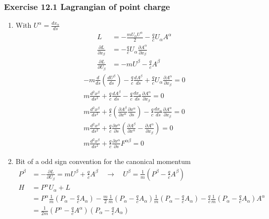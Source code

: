 \documentclass[10pt,a4paper]{book}
\theoremstyle{definition}
\begin{document}
\subsubsection{Exercise 12.1 Lagrangian of point charge}
\begin{enumerate}
\item With $U^\alpha=\frac{dx_\alpha}{ds}$
\begin{align}
	L&=-\frac{mU_\alpha U^\alpha}{2}-\frac{q}{c}U_\alpha A^\alpha\\
	\frac{\partial L}{\partial x_\beta}&=-\frac{q}{c}U_\alpha\frac{\partial A^\alpha}{\partial x_\beta}\\
	\frac{\partial L}{\partial U_\beta}&=-mU^\beta-\frac{q}{c}A^\beta
\end{align}
\begin{align}
	-m\frac{d}{ds}\left(\frac{dU^\beta}{ds}\right)-\frac{q}{c}\frac{dA^\beta}{ds}+\frac{q}{c}U_\alpha\frac{\partial A^\alpha}{\partial x_\beta}=0\\
	m\frac{d^2x^\beta}{ds^2}+\frac{q}{c}\frac{dA^\beta}{ds}-\frac{q}{c}\frac{dx_\alpha}{ds}\frac{\partial A^\alpha}{\partial x_\beta}=0\\
	m\frac{d^2x^\beta}{ds^2}+\frac{q}{c}\left(\frac{\partial A^\beta}{\partial x^\alpha}\frac{\partial x^\alpha}{\partial s}\right)-\frac{q}{c}\frac{dx_\alpha}{ds}\frac{\partial A^\alpha}{\partial x_\beta}=0\\
	m\frac{d^2x^\beta}{ds^2}+\frac{q}{c}\frac{\partial x^\alpha}{\partial s}\left(\frac{\partial A^\beta}{\partial x^\alpha}-\frac{\partial A^\alpha}{\partial x_\beta}\right)=0\\
	m\frac{d^2x^\beta}{ds^2}+\frac{q}{c}\frac{\partial x^\alpha}{\partial s}F^{\alpha\beta}=0
\end{align}
\item Bit of a odd sign convention for the canonical momentum
\begin{align}
P^\beta&=-\frac{\partial L}{\partial U_\beta}=mU^\beta+\frac{q}{c}A^\beta\quad\rightarrow\quad U^\beta=\frac{1}{m}\left(P^\beta-\frac{q}{c}A^\beta\right)\\
H&=P^\alpha U_\alpha+L\\
&=P^\alpha\frac{1}{m}\left(P_\alpha-\frac{q}{c}A_\alpha\right)-\frac{m}{2}\frac{1}{m}\left(P_\alpha-\frac{q}{c}A_\alpha\right)\frac{1}{m}\left(P_\alpha-\frac{q}{c}A_\alpha\right)-\frac{q}{c}\frac{1}{m}\left(P_\alpha-\frac{q}{c}A_\alpha\right)A^\alpha\\
&=\frac{1}{2m}\left(P^\alpha-\frac{q}{c}A^\alpha\right)\left(P_\alpha-\frac{q}{c}A_\alpha\right)

\end{align}
\end{enumerate}
\end{document}
